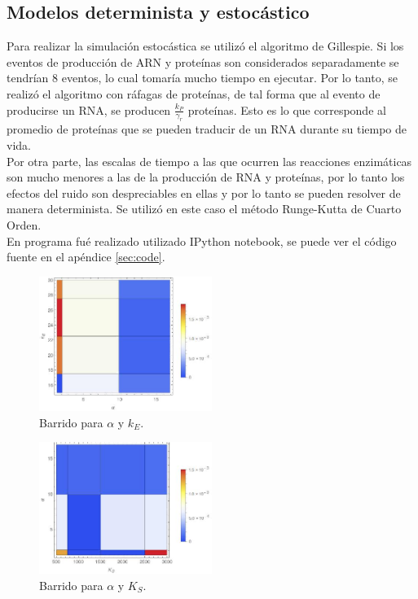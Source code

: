 \documentclass[12pt]{article}
\begin{document}
\subsection{Modelos determinista y estoc\'astico}

Para realizar la simulaci\'on estoc\'astica se utiliz\'o el algoritmo de Gillespie. Si los eventos de producci\'on de ARN y prote\'inas son considerados separadamente se tendr\'ian 8 eventos, lo cual tomar\'ia mucho tiempo en ejecutar. Por lo tanto, se realiz\'o el algoritmo con r\'afagas de prote\'inas, de tal forma que al evento de producirse un RNA, se producen $\frac{k_P}{\gamma_r}$ prote\'inas. Esto es lo que corresponde al promedio de prote\'inas que se pueden traducir de un RNA durante su tiempo de vida.\\

Por otra parte, las escalas de tiempo a las que ocurren las reacciones enzim\'aticas son mucho menores a las de la producci\'on de RNA y prote\'inas, por lo tanto los efectos del ruido son despreciables en ellas y por lo tanto se pueden resolver de manera determinista. Se utiliz\'o en este caso el m\'etodo Runge-Kutta de Cuarto Orden.\\

En programa fu\'e realizado utilizado IPython notebook, se puede ver el c\'odigo fuente en el ap\'endice \ref{sec:code}.

\begin{figure}[H]
  \centering
  \includegraphics[width=0.5\textwidth]{alpha-kE.jpeg}
  \caption{\label{fig:alpha-kE} Barrido para $\alpha$ y $k_E$.}
 \end{figure}

\begin{figure}[H]
  \centering
  \includegraphics[width=0.5\textwidth]{alpha-KS.jpeg}
  \caption{\label{fig:alpha-kS} Barrido para $\alpha$ y $K_S$.}
 \end{figure}
\end{document}
